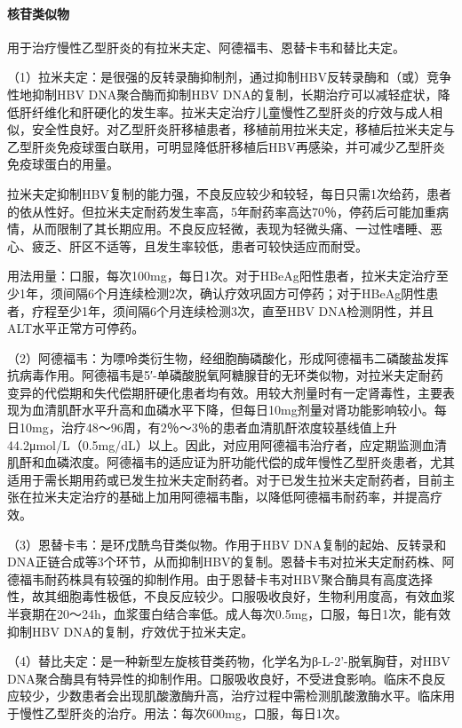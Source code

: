 \paragraph{核苷类似物}

用于治疗慢性乙型肝炎的有拉米夫定、阿德福韦、恩替卡韦和替比夫定。

（1）拉米夫定：是很强的反转录酶抑制剂，通过抑制HBV反转录酶和（或）竞争性地抑制HBV
DNA聚合酶而抑制HBV
DNA的复制，长期治疗可以减轻症状，降低肝纤维化和肝硬化的发生率。拉米夫定治疗儿童慢性乙型肝炎的疗效与成人相似，安全性良好。对乙型肝炎肝移植患者，移植前用拉米夫定，移植后拉米夫定与乙型肝炎免疫球蛋白联用，可明显降低肝移植后HBV再感染，并可减少乙型肝炎免疫球蛋白的用量。

拉米夫定抑制HBV复制的能力强，不良反应较少和较轻，每日只需1次给药，患者的依从性好。但拉米夫定耐药发生率高，5年耐药率高达70％，停药后可能加重病情，从而限制了其长期应用。不良反应轻微，表现为轻微头痛、一过性嗜睡、恶心、疲乏、肝区不适等，且发生率较低，患者可较快适应而耐受。

用法用量：口服，每次100mg，每日1次。对于HBeAg阳性患者，拉米夫定治疗至少1年，须间隔6个月连续检测2次，确认疗效巩固方可停药；对于HBeAg阴性患者，疗程至少1年，须间隔6个月连续检测3次，直至HBV
DNA检测阴性，并且ALT水平正常方可停药。

（2）阿德福韦：为嘌呤类衍生物，经细胞酶磷酸化，形成阿德福韦二磷酸盐发挥抗病毒作用。阿德福韦是5′-单磷酸脱氧阿糖腺苷的无环类似物，对拉米夫定耐药变异的代偿期和失代偿期肝硬化患者均有效。用较大剂量时有一定肾毒性，主要表现为血清肌酐水平升高和血磷水平下降，但每日10mg剂量对肾功能影响较小。每日10mg，治疗48～96周，有2％～3％的患者血清肌酐浓度较基线值上升44.2μmol/L（0.5mg/dL）以上。因此，对应用阿德福韦治疗者，应定期监测血清肌酐和血磷浓度。阿德福韦的适应证为肝功能代偿的成年慢性乙型肝炎患者，尤其适用于需长期用药或已发生拉米夫定耐药者。对于已发生拉米夫定耐药者，目前主张在拉米夫定治疗的基础上加用阿德福韦酯，以降低阿德福韦耐药率，并提高疗效。

（3）恩替卡韦：是环戊酰鸟苷类似物。作用于HBV
DNA复制的起始、反转录和DNA正链合成等3个环节，从而抑制HBV的复制。恩替卡韦对拉米夫定耐药株、阿德福韦耐药株具有较强的抑制作用。由于恩替卡韦对HBV聚合酶具有高度选择性，故其细胞毒性极低，不良反应较少。口服吸收良好，生物利用度高，有效血浆半衰期在20～24h，血浆蛋白结合率低。成人每次0.5mg，口服，每日1次，能有效抑制HBV
DNA的复制，疗效优于拉米夫定。

（4）替比夫定：是一种新型左旋核苷类药物，化学名为β-L-2'{-}脱氧胸苷，对HBV
DNA聚合酶具有特异性的抑制作用。口服吸收良好，不受进食影响。临床不良反应较少，少数患者会出现肌酸激酶升高，治疗过程中需检测肌酸激酶水平。临床用于慢性乙型肝炎的治疗。用法：每次600mg，口服，每日1次。


